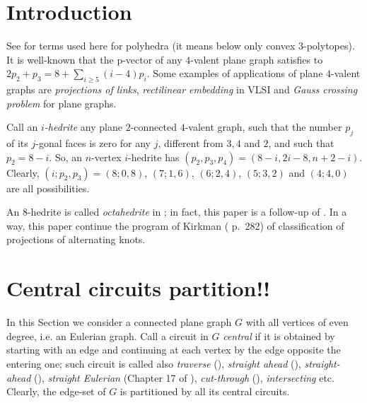 \documentclass[12pt]{article}
\begin{document}
\section{Introduction}

See \cite{Gr} for terms used here for polyhedra (it means below only convex
$3$-polytopes).
It is well-known that the p-vector of any $4$-valent plane graph satisfies to
$2p_2+p_3=8+ \sum_{i\geq 5} (i-4)p_i$.
Some examples of applications of plane $4$-valent graphs are {\em projections
of links}, {\em rectilinear embedding} in VLSI and {\em Gauss crossing 
problem} for plane graphs.

\vspace{2mm}





Call an {\em $i$-hedrite} any plane $2$-connected
$4$-valent graph, such that the number
$p_j$ of its $j$-gonal faces is zero for any $j$, different from 
$3,4$ and $2$, and such that $p_2=8-i$. So, 
an $n$-vertex $i$-hedrite has $(p_2, p_3, p_4)=(8-i, 2i-8, n+2-i)$.
Clearly, $(i;p_2,p_3)=(8;0,8)$, $(7;1,6)$, $(6;2,4)$,
$(5;3,2)$ and $(4;4,0)$ are all possibilities. 

An $8$-hedrite is called {\em octahedrite} in \cite{DSt}; in fact, this paper is a follow-up of \cite{DSt}.
In a way, this paper continue the program of Kirkman (\cite{Kirk} p.~282) of classification of projections of alternating knots.








\section{Central circuits partition!!}

In this Section we consider a connected plane graph $G$ with all vertices of 
even degree, i.e. an Eulerian graph. 
Call a circuit in $G$ {\it central} if it is obtained by starting with an
edge and continuing at each vertex by the edge opposite the entering one; such 
circuit is called also {\em traverse} 
(\cite{GK}), {\em straight ahead} (\cite{Ha}),  
{\em straight-ahead} (\cite{PTZ}), {\em straight Eulerian}
(Chapter 17 of \cite{God}), {\em cut-through}
(\cite{Je}),
{\em intersecting} etc. Clearly, the edge-set of 
$G$ is partitioned by all its central circuits.
\end{document}
